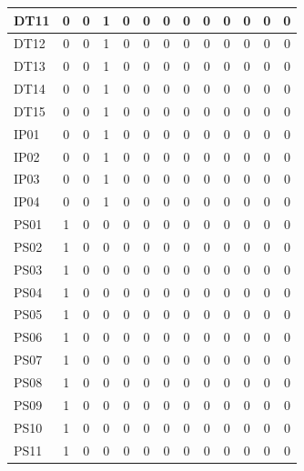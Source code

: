 \documentclass [10pt]{article}
\begin{document}
\begin{longtable}{ | p{} | c | c | c | c | c | c | c | c | c | c | c | c | }
	DT11 & 0 & 0 & 1 & 0 & 0 & 0 & 0 & 0 & 0 & 0 & 0 & 0 \\ \hline
	DT12 & 0 & 0 & 1 & 0 & 0 & 0 & 0 & 0 & 0 & 0 & 0 & 0 \\ \hline
	DT13 & 0 & 0 & 1 & 0 & 0 & 0 & 0 & 0 & 0 & 0 & 0 & 0 \\ \hline
	DT14 & 0 & 0 & 1 & 0 & 0 & 0 & 0 & 0 & 0 & 0 & 0 & 0 \\ \hline
	DT15 & 0 & 0 & 1 & 0 & 0 & 0 & 0 & 0 & 0 & 0 & 0 & 0 \\ \hline
	IP01 & 0 & 0 & 1 & 0 & 0 & 0 & 0 & 0 & 0 & 0 & 0 & 0 \\ \hline
	IP02 & 0 & 0 & 1 & 0 & 0 & 0 & 0 & 0 & 0 & 0 & 0 & 0 \\ \hline
	IP03 & 0 & 0 & 1 & 0 & 0 & 0 & 0 & 0 & 0 & 0 & 0 & 0 \\ \hline
	IP04 & 0 & 0 & 1 & 0 & 0 & 0 & 0 & 0 & 0 & 0 & 0 & 0 \\ \hline
	PS01 & 1 & 0 & 0 & 0 & 0 & 0 & 0 & 0 & 0 & 0 & 0 & 0 \\ \hline
	PS02 & 1 & 0 & 0 & 0 & 0 & 0 & 0 & 0 & 0 & 0 & 0 & 0 \\ \hline
	PS03 & 1 & 0 & 0 & 0 & 0 & 0 & 0 & 0 & 0 & 0 & 0 & 0 \\ \hline
	PS04 & 1 & 0 & 0 & 0 & 0 & 0 & 0 & 0 & 0 & 0 & 0 & 0 \\ \hline
	PS05 & 1 & 0 & 0 & 0 & 0 & 0 & 0 & 0 & 0 & 0 & 0 & 0 \\ \hline
	PS06 & 1 & 0 & 0 & 0 & 0 & 0 & 0 & 0 & 0 & 0 & 0 & 0 \\ \hline
	PS07 & 1 & 0 & 0 & 0 & 0 & 0 & 0 & 0 & 0 & 0 & 0 & 0 \\ \hline
	PS08 & 1 & 0 & 0 & 0 & 0 & 0 & 0 & 0 & 0 & 0 & 0 & 0 \\ \hline
	PS09 & 1 & 0 & 0 & 0 & 0 & 0 & 0 & 0 & 0 & 0 & 0 & 0 \\ \hline
	PS10 & 1 & 0 & 0 & 0 & 0 & 0 & 0 & 0 & 0 & 0 & 0 & 0 \\ \hline
	PS11 & 1 & 0 & 0 & 0 & 0 & 0 & 0 & 0 & 0 & 0 & 0 & 0 \\ \hline
\end{longtable}
\end{document}
